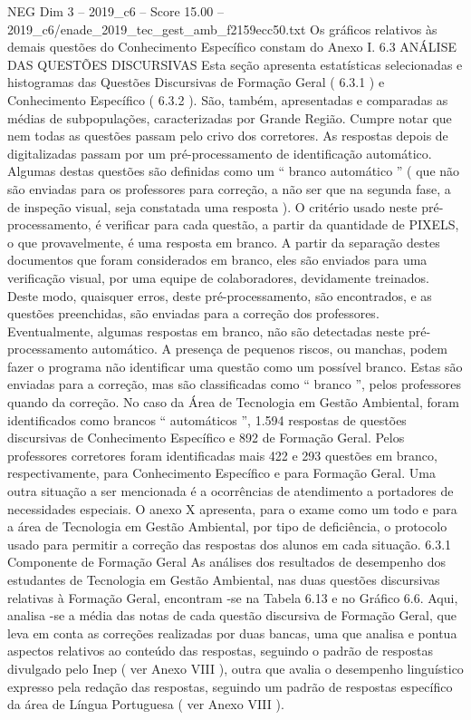 \begin{textsample}{NEG Dim 3 – 2019\_c6 – Score 15.00 – 2019\_c6/enade\_2019\_tec\_gest\_amb\_f2159ecc50.txt}
Os gráficos relativos às demais questões do Conhecimento Específico constam do Anexo I. 6.3 ANÁLISE DAS QUESTÕES DISCURSIVAS Esta seção apresenta estatísticas selecionadas e histogramas das Questões Discursivas de Formação Geral ( 6.3.1 ) e Conhecimento Específico ( 6.3.2 ).
São, também, apresentadas e comparadas as médias de subpopulações, caracterizadas por Grande Região.
Cumpre notar que nem todas as questões passam pelo crivo dos corretores.
As respostas depois de digitalizadas passam por um pré-processamento de identificação automático.
Algumas destas questões são definidas como um “ branco automático ” ( que não são enviadas para os professores para correção, a não ser que na segunda fase, a de inspeção visual, seja constatada uma resposta ).
O critério usado neste pré-processamento, é verificar para cada questão, a partir da quantidade de PIXELS, o que provavelmente, é uma resposta em branco.
A partir da separação destes documentos que foram considerados em branco, eles são enviados para uma verificação visual, por uma equipe de colaboradores, devidamente treinados.
Deste modo, quaisquer erros, deste pré-processamento, são encontrados, e as questões preenchidas, são enviadas para a correção dos professores.
Eventualmente, algumas respostas em branco, não são detectadas neste pré-processamento automático.
A presença de pequenos riscos, ou manchas, podem fazer o programa não identificar uma questão como um possível branco.
Estas são enviadas para a correção, mas são classificadas como “ branco ”, pelos professores quando da correção.
No caso da Área de Tecnologia em Gestão Ambiental, foram identificados como brancos “ automáticos ”, 1.594 respostas de questões discursivas de Conhecimento Específico e 892 de Formação Geral.
Pelos professores corretores foram identificadas mais 422 e 293 questões em branco, respectivamente, para Conhecimento Específico e para Formação Geral.
Uma outra situação a ser mencionada é a ocorrências de atendimento a portadores de necessidades especiais.
O anexo X apresenta, para o exame como um todo e para a área de Tecnologia em Gestão Ambiental, por tipo de deficiência, o protocolo usado para permitir a correção das respostas dos alunos em cada situação. 6.3.1 Componente de Formação Geral As análises dos resultados de desempenho dos estudantes de Tecnologia em Gestão Ambiental, nas duas questões discursivas relativas à Formação Geral, encontram -se na Tabela 6.13 e no Gráfico 6.6.
Aqui, analisa -se a média das notas de cada questão discursiva de Formação Geral, que leva em conta as correções realizadas por duas bancas, uma que analisa e pontua aspectos relativos ao conteúdo das respostas, seguindo o padrão de respostas divulgado pelo Inep ( ver Anexo VIII ), outra que avalia o desempenho linguístico expresso pela redação das respostas, seguindo um padrão de respostas específico da área de Língua Portuguesa ( ver Anexo VIII ).

\end{textsample}
